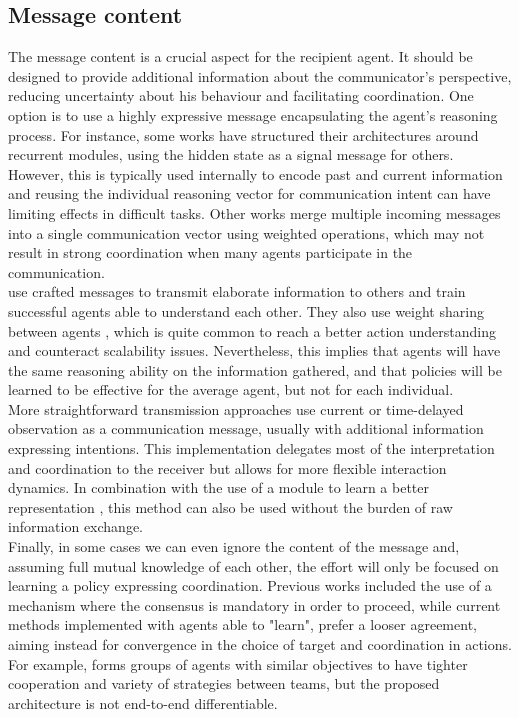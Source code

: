 \documentclass[a4paper,singleside,12pt]{report} %
\begin{document}
\subsection{Message content}\label{message-content}
The message content is a crucial aspect for the recipient agent. It should be designed to provide additional information about the communicator's perspective, reducing uncertainty about his behaviour and facilitating coordination. One option is to use a highly expressive message encapsulating the agent's reasoning process. For instance, some works \cite{Sukhbaatar2016LearningMC, IC3NETSingh2018LearningWT, Das2018TarMACTM, Peng2017MultiagentBN} have structured their architectures around recurrent modules, using the hidden state as a signal message for others. However, this is typically used internally to encode past and current information and reusing the individual reasoning vector for communication intent can have limiting effects in difficult tasks. Other works \cite{Sukhbaatar2016LearningMC, IC3NETSingh2018LearningWT} merge multiple incoming messages into a single communication vector using weighted operations, which may not result in strong coordination when many agents participate in the communication.\\
\cite{Das2018TarMACTM, ATOCJiang2018LearningAC} use crafted messages to transmit elaborate information to others and train successful agents able to understand each other. They also use weight sharing between agents \cite{Kim2021CommunicationIM, Das2018TarMACTM, Peng2017MultiagentBN, ATOCJiang2018LearningAC}, which is quite common to reach a better action understanding and counteract scalability issues. Nevertheless, this implies that agents will have the same reasoning ability on the information gathered, and that policies will be learned to be effective for the average agent, but not for each individual.\\
More straightforward transmission approaches \cite{Liu2020When2comMP, Kim2021CommunicationIM} use current or time-delayed observation as a communication message, usually with additional information expressing intentions. This implementation delegates most of the interpretation and coordination to the receiver but allows for more flexible interaction dynamics. In combination with the use of a module to learn a better representation \cite{Lin2021LearningTG}, this method can also be used without the burden of raw information exchange.\\
Finally, in some cases we can even ignore the content of the message and, assuming full mutual knowledge of each other, the effort will only be focused on learning a policy expressing coordination. Previous works \cite{Ren2005ConsensusSI, OlfatiSaber2007ConsensusAC} included the use of a mechanism where the consensus is mandatory in order to proceed, while current methods implemented with agents able to "learn", prefer a looser agreement, aiming instead for convergence in the choice of target and coordination in actions. For example, \cite{Li2021StructuredDE} forms groups of agents with similar objectives to have tighter cooperation and variety of strategies between teams, but the proposed architecture is not end-to-end differentiable.\\
\end{document}
